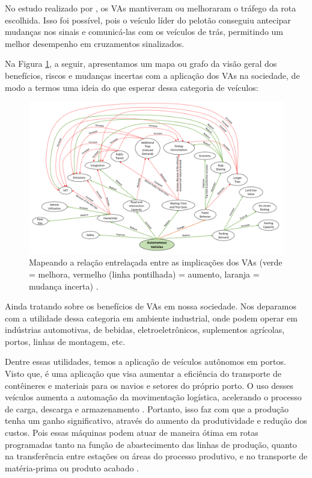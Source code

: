 No estudo realizado por \cite{conge}, os VAs mantiveram ou melhoraram o tráfego da rota escolhida. Isso foi possível, pois o veículo líder do pelotão conseguiu antecipar mudanças nos sinais e comunicá-las com os veículos de trás, permitindo um melhor desempenho em cruzamentos sinalizados.

Na Figura \ref{mapa_resumo}, a seguir, apresentamos um mapa ou grafo da visão geral dos benefícios, riscos e mudanças incertas com a aplicação dos VAs na sociedade, de modo a termos uma ideia do que esperar dessa categoria de veículos:
\begin{figure}[H]
\centering
\includegraphics[width=16cm]{Figures/map.png}
\caption{Mapeando a relação entrelaçada entre as implicações dos VAs (verde = melhora, vermelho (linha pontilhada) = aumento, laranja = mudança incerta) \cite{mundobrasil}.}
\label{mapa_resumo}
\end{figure}

 \label{industria}

Ainda tratando sobre os benefícios de VAs em nossa sociedade. Nos deparamos com a utilidade dessa categoria em ambiente industrial, onde podem operar em indústrias automotivas, de bebidas, eletroeletrônicos, suplementos agrícolas, portos, linhas de montagem, etc.

Dentre essas utilidades, temos a aplicação de veículos autônomos em portos. Visto que, é uma aplicação que visa aumentar a eficiência do transporte de contêineres e materiais para os navios e setores do próprio porto. O uso desses veículos aumenta a automação da movimentação logística, acelerando o processo de carga, descarga e armazenamento \cite{aplicacao, aplicacao2}.
Portanto, isso faz com que a produção tenha um ganho significativo, através do aumento da produtividade e redução dos custos. Pois essas máquinas podem atuar de maneira ótima em rotas programadas tanto na função de abastecimento das linhas de produção, quanto na transferência entre estações ou áreas do processo produtivo, e no transporte de matéria-prima ou produto acabado \cite{aplicacao}.

